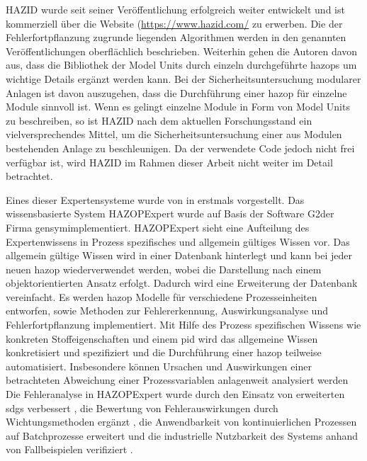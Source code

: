 HAZID wurde seit seiner Ver\"offentlichung erfolgreich weiter entwickelt und ist kommerziell \"uber die Website (\url{https://www.hazid.com/} zu erwerben. \newline
Die der Fehlerfortpflanzung zugrunde liegenden Algorithmen werden in den genannten Ver\"offentlichungen oberfl\"achlich beschrieben. Weiterhin gehen die Autoren davon aus, dass die Bibliothek der Model Units durch einzeln durchgef\"uhrte \acp{hazop} um wichtige Details erg\"anzt werden kann. Bei der Sicherheitsuntersuchung modularer Anlagen ist davon auszugehen, dass die Durchf\"uhrung einer \ac{hazop} f\"ur einzelne Module sinnvoll ist. Wenn es gelingt einzelne Module in Form von Model Units zu beschreiben, so ist HAZID nach dem aktuellen Forschungsstand ein vielversprechendes Mittel, um die Sicherheitsuntersuchung einer aus Modulen bestehenden Anlage zu beschleunigen. Da der verwendete Code jedoch nicht frei verf\"ugbar ist, wird HAZID im Rahmen dieser Arbeit nicht weiter im Detail betrachtet. \newline

Eines dieser Expertensysteme wurde von \citeauthor{Venkatasubramanian1994} in  \cite{Venkatasubramanian1994} erstmals vorgestellt. Das wissensbasierte System HAZOPExpert wurde auf Basis der Software \glqq G2\grqq { }der Firma \glqq gensym\grqq { }implementiert. HAZOPExpert sieht eine Aufteilung des Expertenwissens in Prozess spezifisches und allgemein g\"ultiges Wissen vor. Das allgemein g\"ultige Wissen wird in einer Datenbank hinterlegt und kann bei jeder neuen \ac{hazop} wiederverwendet werden, wobei die Darstellung nach einem objektorientierten Ansatz erfolgt. Dadurch wird eine Erweiterung der Datenbank vereinfacht. Es werden \ac{hazop} Modelle f\"ur verschiedene Prozesseinheiten entworfen, sowie Methoden zur Fehlererkennung,  Auswirkungsanalyse und Fehlerfortpflanzung implementiert. Mit Hilfe des Prozess spezifischen Wissens wie konkreten Stoffeigenschaften und einem \ac{pid} wird das allgemeine Wissen konkretisiert und spezifiziert und die Durchf\"uhrung einer \ac{hazop} teilweise automatisiert. Insbesondere k\"onnen Ursachen und Auswirkungen einer betrachteten Abweichung einer Prozessvariablen anlagenweit analysiert werden  \newline
Die Fehleranalyse in HAZOPExpert wurde durch den Einsatz von erweiterten \acp{sdg} verbessert \cite{Vaidhyanathan_1995}, die Bewertung von Fehlerauswirkungen durch Wichtungsmethoden erg\"anzt \cite{Vaidhyanathan_1996}, die Anwendbarkeit von kontinuierlichen Prozessen auf Batchprozesse erweitert \cite{Venkatasubramanian_2000} und die industrielle Nutzbarkeit des Systems anhand von Fallbeispielen verifiziert \cite{Venkatasubramanian1994,Vaidhyanathan1996,Venkatasubramanian_2000}.  

